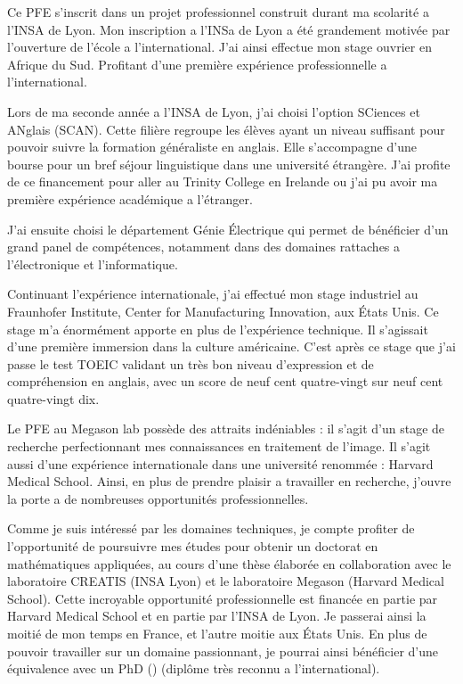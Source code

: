 Ce PFE s'inscrit dans un projet professionnel construit durant ma scolarité a l'INSA de Lyon.
Mon inscription a l'INSa de Lyon a été grandement motivée par l'ouverture de l'école a l'international. J'ai ainsi effectue mon stage ouvrier en Afrique du Sud. Profitant d'une première expérience professionnelle a l'international.

Lors de ma seconde année a l'INSA de Lyon, j'ai choisi l'option SCiences et ANglais (SCAN). Cette filière regroupe les élèves ayant un niveau suffisant pour pouvoir suivre la formation généraliste en anglais. Elle s'accompagne d'une bourse pour un bref séjour linguistique dans une université étrangère. J'ai profite de ce financement pour aller au Trinity College en Irelande ou j'ai pu avoir ma première expérience académique a l'étranger.

J'ai ensuite choisi le département Génie Électrique qui permet de bénéficier d'un grand panel de compétences, notamment dans des domaines rattaches a l'électronique et l'informatique.

Continuant l'expérience internationale, j'ai effectué mon stage industriel au Fraunhofer Institute, Center for Manufacturing Innovation, aux États Unis. Ce stage m'a énormément apporte en plus de l'expérience technique. Il s'agissait d'une première immersion dans la culture américaine. C'est après ce stage que j'ai passe le test TOEIC validant un très bon niveau d'expression et de compréhension en anglais, avec un score de neuf cent quatre-vingt sur neuf cent quatre-vingt dix.

Le PFE au Megason lab possède des attraits indéniables : il s'agit d'un stage de recherche perfectionnant mes connaissances en traitement de l'image. Il s'agit aussi d'une expérience internationale dans une université renommée : Harvard Medical School. Ainsi, en plus de prendre plaisir a travailler en recherche, j'ouvre la porte a de nombreuses opportunités professionnelles.

Comme je suis intéressé par les domaines techniques, je compte profiter de l'opportunité de poursuivre mes études pour obtenir un doctorat en mathématiques appliquées, au cours d'une thèse élaborée en collaboration avec le laboratoire CREATIS (INSA Lyon) et le laboratoire Megason (Harvard Medical School). Cette incroyable opportunité professionnelle est financée en partie par Harvard Medical School et en partie par l'INSA de Lyon. Je passerai ainsi la moitié de mon temps en France, et l'autre moitie aux États Unis.
En plus de pouvoir travailler sur un domaine passionnant, je pourrai ainsi bénéficier d'une équivalence avec un PhD () (diplôme très reconnu a l'international). 


